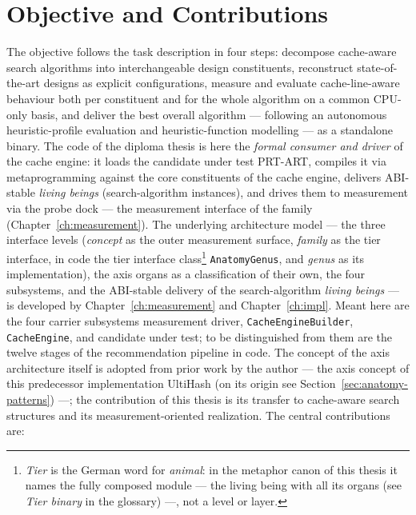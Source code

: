 \section{Objective and Contributions}\label{sec:contributions}
The objective follows the task description in four steps: decompose cache-aware search algorithms into
interchangeable design constituents, reconstruct state-of-the-art designs as explicit configurations,
measure and evaluate cache-line-aware behaviour both per constituent and for the whole algorithm
on a common CPU-only basis, and deliver the best overall algorithm --- following an autonomous
heuristic-profile evaluation and heuristic-function modelling --- as a standalone binary.
The code of the diploma thesis is here the \emph{formal consumer and driver} of the cache engine: it loads the
candidate under test PRT-ART, compiles it via metaprogramming against the core constituents of the cache engine, delivers
ABI-stable \emph{living beings} (search-algorithm instances), and drives them to measurement via the probe dock --- the
measurement interface of the family (Chapter~\ref{ch:measurement}).
The underlying architecture model
--- the three interface levels (\emph{concept} as the outer measurement surface, \emph{family} as the tier
interface, in code the tier interface class\footnote{\emph{Tier} is the German word for \emph{animal}: in the
  metaphor canon of this thesis it names the fully composed module --- the living being with all its
  organs (see \emph{Tier binary} in the glossary) ---, not a level or layer.} \texttt{AnatomyGenus}, and \emph{genus}
as its implementation), the axis organs as a classification of their own, the four subsystems, and the ABI-stable delivery of the search-algorithm \emph{living beings}
--- is developed by
Chapter~\ref{ch:measurement} and Chapter~\ref{ch:impl}. Meant here are the four carrier subsystems
measurement driver, \texttt{CacheEngineBuilder}, \texttt{CacheEngine}, and candidate under test; to be distinguished from them are
the twelve stages of the recommendation pipeline in code. The concept of the axis architecture itself is adopted from
prior work by the author --- the axis concept of this predecessor implementation UltiHash (on its origin see
Section~\ref{sec:anatomy-patterns}) ---; the contribution of this thesis is
its transfer to cache-aware search structures and its measurement-oriented realization. The
central contributions are:
